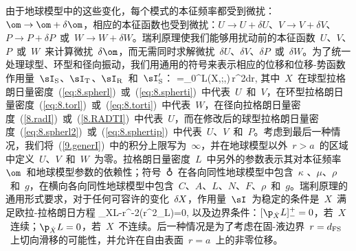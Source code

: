 由于地球模型中的这些变化，每个模式的本征频率都受到微扰：$\om\rightarrow\om+\delta\om$，相应的本征函数也受到微扰：$U\rightarrow U+\delta U$、$V\rightarrow V+\delta V$、$P\rightarrow P+\delta P$~或~$W\rightarrow W+\delta W$。瑞利原理使我们能够用扰动前的本征函数~$U$、$V$、$P$~或~$W$~来计算微扰~$\delta\om$，而无需同时求解微扰~$\delta U$、$\delta V$、$\delta P$~或~$\delta W$。为了统一处理球型、环型和径向振动，我们用通用的符号来表示相应的位移和位移-势函数作用量~$\sI_{\rm S}$、$\sI_{\rm T}$、$\sI_{\rm R}$~和~$\sI_{\rm S}^{\prime}$：
\eq \label{9.generI}
\sI=\int_0^{\infty}L(X,;\om,\earth)\,r^2dr,
\en
{}%
其中~$X$~在球型拉格朗日量密度~(\ref{eq:8.spherl})~或~(\ref{eq:8.spherti})~中代表~$U$~和~$V$，在环型拉格朗日量密度~(\ref{eq:8.torl})~或~(\ref{eq:8.torti})~中代表~$W$，在径向拉格朗日量密度~(\ref{8.radI})~或~(\ref{8.RADTI})~中代表~$U$，而在修改后的球型拉格朗日量密度~(\ref{eq:8.spherl2})~或~(\ref{eq:8.sphertip})~中代表~$U$、$V$~和~$P$。考虑到最后一种情况，我们将~(\ref{9.generI})~中的积分上限写为~$\infty$，并在地球模型以外~$r>a$~的区域中定义~$U$、$V$~和~$W$~为零。拉格朗日量密度~$L$~中另外的参数表示其对本征频率~$\om$~和地球模型参数的依赖性；符号~$\earth$~在各向同性地球模型中包含~$\kappa$
、$\mu$、$\rho$~和~$g$，在横向各向同性地球模型中包含~$C$、$A$、$L$、$N$、$F$、$\rho$~和~$g$。瑞利原理的通用形式要求，对于任何可容许的变化~$\delta\hspace{-0.2 mm}X$，作用量~$\sI$~为稳定的条件是~$X$~满足欧拉-拉格朗日方程
\eq \label{9.ELeqn}
\p_XL-r^{-2}(r^2\p_{}L)=0,
\en
以及边界条件：$[\p_{\dot{X}}L]^+_-=0$，若~$X$~连续；$\p_{\dot{X}}L=0$，若~$X$~不连续。后一种情况是为了考虑在固-液边界~$r=d_{\rm FS}$~上切向滑移的可能性，并允许在自由表面~$r=a$~上的非零位移。

